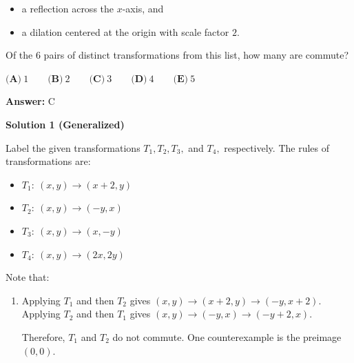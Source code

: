 \begin{enumerate}
            \begin{itemize}
        \item a reflection across the $x$-axis, and
            \end{itemize}
            
            \begin{itemize}
        \item a dilation centered at the origin with scale factor $2.$
            \end{itemize}
            Of the $6$ pairs of distinct transformations from this list, how many are commute?


 $\textbf{(A)}~1\qquad\textbf{(B)}~2\qquad\textbf{(C)}~3\qquad\textbf{(D)}~4\qquad\textbf{(E)}~5$

 \textbf{Answer: }C



\textbf{Solution 1 (Generalized)}

Label the given transformations $T_1, T_2, T_3,$ and $T_4,$ respectively. The rules of transformations are:

 
            \begin{itemize}
        \item $T_1: \ (x,y)\to(x+2,y)$
            \end{itemize}
            
            \begin{itemize}
        \item $T_2: \ (x,y)\to(-y,x)$
            \end{itemize}
            
            \begin{itemize}
        \item $T_3: \ (x,y)\to(x,-y)$
            \end{itemize}
            
            \begin{itemize}
        \item $T_4: \ (x,y)\to(2x,2y)$
            \end{itemize}
            Note that:

 
            \begin{enumerate} 
        \item Applying $T_1$ and then $T_2$ gives $(x,y)\to(x+2,y)\to(-y,x+2).$ Applying $T_2$ and then $T_1$ gives $(x,y)\to(-y,x)\to(-y+2,x).$ 

 Therefore, $T_1$ and $T_2$ do not commute. One counterexample is the preimage $(0,0).$



\end{enumerate}
\end{enumerate}
